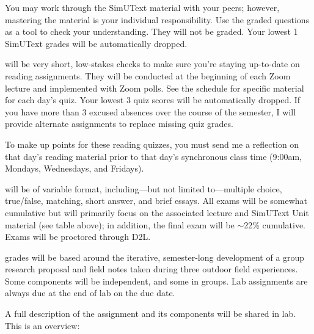 \documentclass{tufte-handout}
\begin{document}
\begin{fullwidth}

You may work through the SimUText material with your peers; however, mastering the material is your individual responsibility. Use the graded questions as a tool to check your understanding. They will not be graded. Your lowest 1 SimUText grades will be automatically dropped.

 will be very short, low-stakes checks to make sure you're staying up-to-date on reading assignments. They will be conducted at the beginning of each Zoom lecture and implemented with Zoom polls. See the schedule for specific material for each day's quiz. Your lowest 3 quiz scores will be automatically dropped. If you have more than 3 excused absences over the course of the semester, I will provide alternate assignments to replace missing quiz grades.

\color{blue}
To make up points for these reading quizzes, you must send me a reflection on that day's reading material prior to that day's synchronous class time (9:00am, Mondays, Wednesdays, and Fridays).
\color{black}

 will be of variable format, including---but not limited to---multiple choice, true/false, matching, short answer, and brief essays. All exams will be somewhat cumulative but will primarily focus on the associated lecture and SimUText Unit material (see table above); in addition, the final exam will be $\sim$22\% cumulative. Exams will be proctored through D2L.



 grades will be based around the iterative, semester-long development of a group research proposal and field notes taken during three outdoor field experiences.  Some components will be independent, and some in groups. Lab assignments are always due at the end of lab on the due date. 

A full description of the assignment and its components will be shared in lab. This is an overview:


\end{fullwidth}
\end{document}
